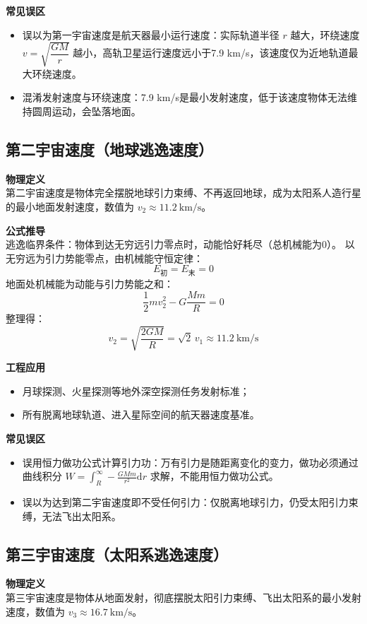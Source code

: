 \textbf{常见误区}
\begin{itemize}
    \item 误以为第一宇宙速度是航天器最小运行速度：实际轨道半径 \(r\) 越大，环绕速度 \(v=\sqrt{\dfrac{GM}{r}}\) 越小，高轨卫星运行速度远小于7.9 km/s，该速度仅为近地轨道最大环绕速度。
    \item 混淆发射速度与环绕速度：7.9 km/s是最小发射速度，低于该速度物体无法维持圆周运动，会坠落地面。
\end{itemize}

\subsection{第二宇宙速度（地球逃逸速度）}
\textbf{物理定义\\}
第二宇宙速度是物体完全摆脱地球引力束缚、不再返回地球，成为太阳系人造行星的最小地面发射速度，数值为 \(v_2 \approx 11.2\ \mathrm{km/s}\)。

\textbf{公式推导\\}
逃逸临界条件：物体到达无穷远引力零点时，动能恰好耗尽（总机械能为0）。
以无穷远为引力势能零点，由机械能守恒定律：
\[
E_{\text{初}} = E_{\text{末}} = 0
\]
地面处机械能为动能与引力势能之和：
\[
\frac{1}{2} m v_2^2 - G \frac{M m}{R} = 0
\]
整理得：
\[
v_2 = \sqrt{\frac{2GM}{R}} = \sqrt{2}\,v_1 \approx 11.2\ \mathrm{km/s}
\]

\textbf{工程应用}
\begin{itemize}
    \item 月球探测、火星探测等地外深空探测任务发射标准；
    \item 所有脱离地球轨道、进入星际空间的航天器速度基准。
\end{itemize}

\textbf{常见误区}
\begin{itemize}
    \item 误用恒力做功公式计算引力功：万有引力是随距离变化的变力，做功必须通过曲线积分 \(\displaystyle W=\int_{R}^{\infty}-\frac{GMm}{r^2}\mathrm{d}r\) 求解，不能用恒力做功公式。
    \item 误以为达到第二宇宙速度即不受任何引力：仅脱离地球引力，仍受太阳引力束缚，无法飞出太阳系。
\end{itemize}

\subsection{第三宇宙速度（太阳系逃逸速度）}
\textbf{物理定义\\}
第三宇宙速度是物体从地面发射，彻底摆脱太阳引力束缚、飞出太阳系的最小发射速度，数值为 \(v_3 \approx 16.7\ \mathrm{km/s}\)。

